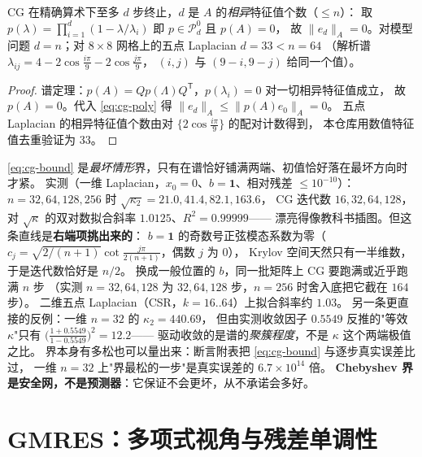 \begin{corollary}
\label{cor:cg-terminate}
CG 在精确算术下至多 $d$ 步终止，$d$ 是 $A$ 的\emph{相异}特征值个数（$\le n$）：
取 $p(\lambda)=\prod_{i=1}^{d}(1-\lambda/\lambda_i)$ 即 $p\in\mathcal P_d^0$ 且 $p(A)=0$，
故 $\|e_d\|_A=0$。对模型问题 $d=n$；对 $8\times8$ 网格上的五点 Laplacian $d=33<n=64$
（解析谱 $\lambda_{ij}=4-2\cos\frac{i\pi}{9}-2\cos\frac{j\pi}{9}$，
$(i,j)$ 与 $(9-i,9-j)$ 给同一个值）。
\end{corollary}

\begin{proof}
谱定理：$p(A)=Qp(\Lambda)Q^{\mathsf T}$，$p(\lambda_i)=0$ 对一切相异特征值成立，
故 $p(A)=0$。代入 \eqref{eq:cg-poly} 得 $\|e_d\|_A\le\|p(A)e_0\|_A=0$。
五点 Laplacian 的相异特征值个数由对 $\{2\cos\frac{i\pi}{9}\}$ 的配对计数得到，
本仓库用数值特征值去重验证为 $33$。
\end{proof}

\begin{remark}
\label{rem:kappa-not-iters}
\eqref{eq:cg-bound} 是\emph{最坏情形}界，只有在谱恰好铺满两端、初值恰好落在最坏方向时才紧。
实测（一维 Laplacian，$x_0=0$、$b=\mathbf 1$、相对残差 $\le10^{-10}$）：
$n=32,64,128,256$ 时 $\sqrt{\kappa_2}=21.0,41.4,82.1,163.6$，
CG 迭代数 $16,32,64,128$，对 $\sqrt\kappa$ 的双对数拟合斜率 $1.0125$、$R^2=0.99999$——
漂亮得像教科书插图。但这条直线是\textbf{右端项挑出来的}：
$b=\mathbf 1$ 的奇数号正弦模态系数为零（$c_j=\sqrt{2/(n+1)}\cot\frac{j\pi}{2(n+1)}$，偶数 $j$ 为 $0$），
Krylov 空间天然只有一半维数，于是迭代数恰好是 $n/2$。
换成一般位置的 $b$，同一批矩阵上 CG 要跑满或近乎跑满 $n$ 步
（实测 $n=32,64,128$ 为 $32,64,128$ 步，$n=256$ 时舍入底把它截在 $164$ 步）。
二维五点 Laplacian（CSR，$k=16..64$）上拟合斜率约 $1.03$。
另一条更直接的反例：一维 $n=32$ 的 $\kappa_2=440.69$，
但由实测收敛因子 $0.5549$ 反推的"等效 $\kappa$"只有
$\bigl(\frac{1+0.5549}{1-0.5549}\bigr)^2=12.2$——
驱动收敛的是谱的\emph{聚簇程度}，不是 $\kappa$ 这个两端极值之比。
界本身有多松也可以量出来：断言附表把 \eqref{eq:cg-bound} 与逐步真实误差比过，
一维 $n=32$ 上"界最松的一步"是真实误差的 $6.7\times10^{14}$ 倍。
\textbf{Chebyshev 界是安全网，不是预测器}：它保证不会更坏，从不承诺会多好。
\end{remark}

\section{GMRES：多项式视角与残差单调性}

